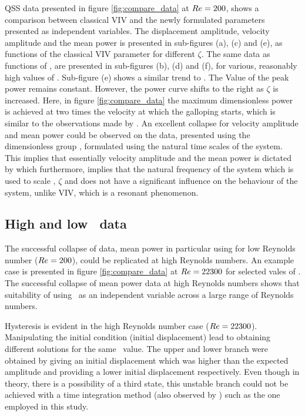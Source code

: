 

QSS data presented in figure \ref{fig:compare_data} at $Re=200$, shows a comparison between classical VIV and the newly formulated parameters presented as independent variables. The displacement amplitude, velocity amplitude and the mean power is presented in sub-figures (a), (c) and (e), as functions of the classical VIV parameter \ustar for different $\zeta$. The same data as functions of \massdamp, are presented in sub-figures (b), (d) and (f), for various, reasonably high values of \massstiff {}. Sub-figure (e) shows a similar trend to \cite{Barrero-Gil2010a}. The Value of the peak power remains constant. However, the power curve shifts to the right as $\zeta$ is increased. Here, in figure \ref{fig:compare_data} the maximum dimensionless power is achieved at two times the velocity at which the galloping starts, which is similar to the observations made by \citet{Barrero-Gil2010a,vicente-Ludlam2014}. An excellent collapse for velocity amplitude and mean power could be observed on the data, presented using the dimensionless group \massdamp, formulated using the natural time scales of the system. This implies that essentially velocity amplitude and the mean power is dictated by \massdamp which furthermore, implies that the natural frequency of the system which is used to scale \ustar, $\zeta$ and \massstiff does not have a significant influence on the behaviour of the system, unlike VIV, which is a resonant phenomenon.  
 

\subsection{High and low \reynoldsnumber \ data}
\label{subsec:high_Re_data}



The successful collapse of data, mean power in particular using \massdamp for low Reynolds number ($Re=200$), could be replicated at high Reynolds numbers. An example case is presented in figure \ref{fig:compare_data} at $Re=22300$ for selected vales of \massstiff. The successful collapse of mean power data at high Reynolds numbers shows that suitability of using \massdamp \ as an independent variable across a large range of Reynolds numbers. 

Hysteresis is evident in the high Reynolds number case ($Re=22300$). Manipulating the initial condition (initial displacement) lead to obtaining different solutions for the same \massdamp \ value. The upper and lower branch were obtained by giving an initial displacement which was higher than the expected amplitude and providing a lower initial displacement respectively. Even though in theory, there is a possibility of a third state, this unstable branch could not be achieved with a time integration method (also observed by \citep{Vio2007}) such as the one employed in this study.

